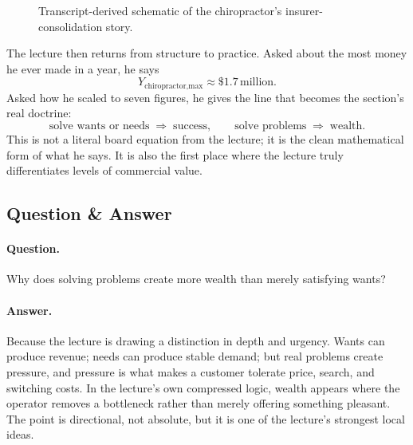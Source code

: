 \begin{figure}[h]
\centering
{}
\caption{Transcript-derived schematic of the chiropractor's insurer-consolidation story.}
\end{figure}

The lecture then returns from structure to practice. Asked about the most money he ever made in a year, he says
\begin{equation}
Y_{\text{chiropractor,max}} \approx \$1.7\,\text{million}.
\end{equation}
Asked how he scaled to seven figures, he gives the line that becomes the section's real doctrine:
\begin{equation}
\text{solve wants or needs} \;\Rightarrow\; \text{success},
\qquad
\text{solve problems} \;\Rightarrow\; \text{wealth}.
\end{equation}
This is not a literal board equation from the lecture; it is the clean mathematical form of what he says. It is also the first place where the lecture truly differentiates levels of commercial value.

\subsection{Question \& Answer}

\paragraph{Question.} Why does solving problems create more wealth than merely satisfying wants?

\paragraph{Answer.} Because the lecture is drawing a distinction in depth and urgency. Wants can produce revenue; needs can produce stable demand; but real problems create pressure, and pressure is what makes a customer tolerate price, search, and switching costs. In the lecture's own compressed logic, wealth appears where the operator removes a bottleneck rather than merely offering something pleasant. The point is directional, not absolute, but it is one of the lecture's strongest local ideas.

